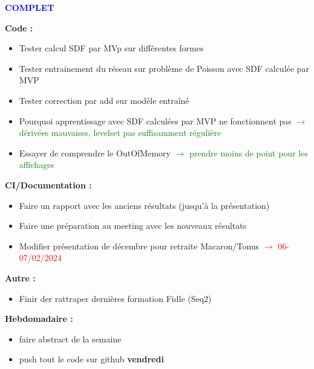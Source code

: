 \textcolor{blue}{\textbf{\large{COMPLET}}}

\textbf{Code :}
\begin{itemize}[label=$\square$] 
	\item[\done] Tester calcul SDF par MVp sur différentes formes
	\item[\done] Tester entrainement du réseau sur problème de Poisson avec SDF calculée par MVP
	\item[\wontfix] Tester correction par add sur modèle entraîné
	\item[\done] Pourquoi apprentissage avec SDF calculées par MVP ne fonctionnent pas \textcolor{green}{$\rightarrow$ dérivées mauvaises, levelset pas suffisamment régulière}
	\item[\done] Essayer de comprendre le OutOfMemory \textcolor{green}{$\rightarrow$ prendre moins de point pour les affichages}
\end{itemize}
\textbf{CI/Documentation :}
\begin{itemize}[label=$\square$] 
	\item[\later] Faire un rapport avec les anciens résultats (jusqu'à la présentation)
	\item[\wontfix] Faire une préparation au meeting avec les nouveaux résultats
	\item[\wontfix] Modifier présentation de décembre pour retraite Macaron/Tonus \textcolor{red}{$\rightarrow$ 06-07/02/2024}
\end{itemize}
\textbf{Autre :}
\begin{itemize}[label=$\square$] 
	\item[\later] Finir der rattraper dernières formation Fidle (Seq2)
\end{itemize}
\textbf{Hebdomadaire :}
\begin{itemize}[label=$\square$] 
	\item[\done] faire abstract de la semaine 
	\item[\done] push tout le code sur github \textbf{vendredi}
\end{itemize}